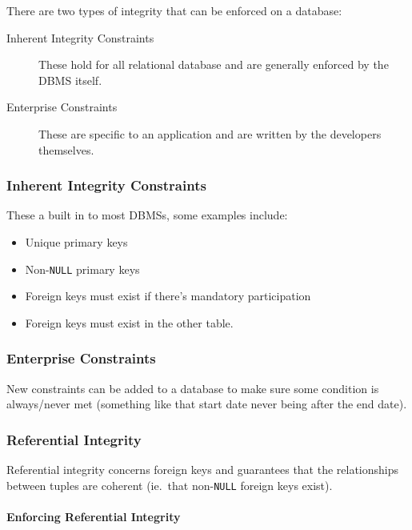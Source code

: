 There are two types of integrity that can be enforced on a database:
\begin{description}
    \item[Inherent Integrity Constraints] These hold for all relational database and are generally enforced by the DBMS itself.
    \item[Enterprise Constraints] These are specific to an application and are written by the developers themselves.
\end{description}

\subsubsection{Inherent Integrity Constraints}\label{ssub:integrity_constraints}

These a built in to most DBMSs, some examples include:
\begin{itemize}
    \item Unique primary keys
    \item Non-\texttt{NULL} primary keys
    \item Foreign keys must exist if there's mandatory participation
    \item Foreign keys must exist in the other table.
\end{itemize}

\subsubsection{Enterprise Constraints}\label{ssub:enterprise_constratints}

New constraints can be added to a database to make sure some condition is always/never met (something like that start date never being after the end date).

\subsubsection{Referential Integrity}\label{ssub:referential_integrity}

Referential integrity concerns foreign keys and guarantees that the relationships between tuples are coherent (ie.\ that non-\texttt{NULL} foreign keys exist).

\paragraph{Enforcing Referential Integrity}\label{par:enforcing_referential_integrity}

